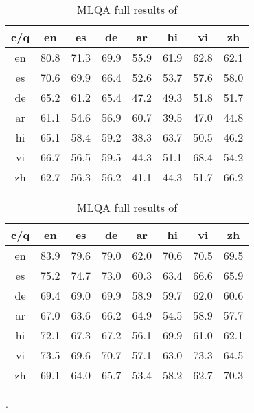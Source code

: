 \documentclass[11pt]{article}
\begin{document}
\begin{table}[h!]
  \small
  \center
  \begin{minipage}[t]{.45\textwidth}
    \begin{center}
      \begin{tabular}{cccccccc} \toprule
        c/q & en & es & de & ar & hi & vi & zh \\ \midrule
        en & 80.8 & 71.3 & 69.9 & 55.9 & 61.9 & 62.8 & 62.1 \\
        es & 70.6 & 69.9 & 66.4 & 52.6 & 53.7 & 57.6 & 58.0 \\
        de & 65.2 & 61.2 & 65.4 & 47.2 & 49.3 & 51.8 & 51.7 \\
        ar & 61.1 & 54.6 & 56.9 & 60.7 & 39.5 & 47.0 & 44.8 \\
        hi & 65.1 & 58.4 & 59.2 & 38.3 & 63.7 & 50.5 & 46.2 \\
        vi & 66.7 & 56.5 & 59.5 & 44.3 & 51.1 & 68.4 & 54.2 \\
        zh & 62.7 & 56.3 & 56.2 & 41.1 & 44.3 & 51.7 & 66.2 \\ \bottomrule
      \end{tabular}
    \end{center}
    \caption{MLQA full results of \mlukeE{}\ba{}}
    \label{table:mlqa-mlukeE-base}
  \end{minipage}
\hspace{5mm}
\begin{minipage}[t]{.45\textwidth}
    \begin{center}
  \begin{tabular}{cccccccc} \toprule
    c/q & en & es & de & ar & hi & vi & zh \\ \midrule
    en & 83.9 & 79.6 & 79.0 & 62.0 & 70.6 & 70.5 & 69.5 \\
    es & 75.2 & 74.7 & 73.0 & 60.3 & 63.4 & 66.6 & 65.9 \\
    de & 69.4 & 69.0 & 69.9 & 58.9 & 59.7 & 62.0 & 60.6 \\
    ar & 67.0 & 63.6 & 66.2 & 64.9 & 54.5 & 58.9 & 57.7 \\
    hi & 72.1 & 67.3 & 67.2 & 56.1 & 69.9 & 61.0 & 62.1 \\
    vi & 73.5 & 69.6 & 70.7 & 57.1 & 63.0 & 73.3 & 64.5 \\
    zh & 69.1 & 64.0 & 65.7 & 53.4 & 58.2 & 62.7 & 70.3 \\
    \bottomrule
  \end{tabular}
  \end{center}
  \caption{MLQA full results of \xlmr{}\la{}}.
  \label{table:mlqa-XLM-R-large}
  \end{minipage}
\end{table}
\end{document}
